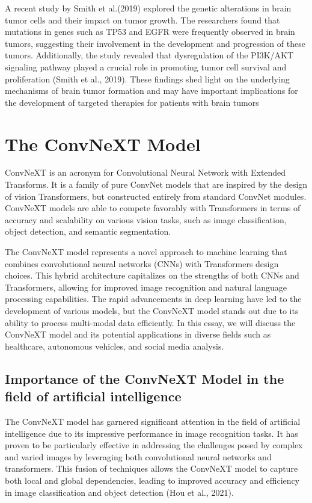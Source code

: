 \documentclass[12pt,oneside]{report}
\begin{document}
A recent study by Smith et al.(2019) explored the genetic alterations in brain tumor cells and their 
impact on tumor growth. The researchers found that mutations in genes such as TP53 and EGFR were 
frequently observed in brain tumors, suggesting their involvement in the development and progression 
of these tumors. Additionally, the study revealed that dysregulation of the PI3K/AKT signaling pathway 
played a crucial role in promoting tumor cell survival and proliferation (Smith et al., 2019). These findings 
shed light on the underlying mechanisms of brain tumor formation and may have important implications 
for the development of targeted therapies for patients with brain tumors

\section{The ConvNeXT Model}
ConvNeXT is an acronym for Convolutional Neural Network with Extended Transforms. It is a family of pure ConvNet models that are inspired by the design of vision Transformers, but constructed entirely from standard ConvNet modules. ConvNeXT models are able to compete favorably with Transformers in terms of accuracy and scalability on various vision tasks, such as image classification, object detection, and semantic segmentation.

The ConvNeXT model represents a novel approach to machine learning that combines convolutional neural networks (CNNs) with Transformers design choices. This hybrid architecture capitalizes on the strengths of both CNNs and Transformers, allowing for improved image recognition and natural language processing capabilities. The rapid advancements in deep learning have led to the development of various models, but the ConvNeXT model stands out due to its ability to process multi-modal data efficiently. In this essay, we will discuss the ConvNeXT model and its potential applications in diverse fields such as healthcare, autonomous vehicles, and social media analysis.

\subsection{Importance of the ConvNeXT Model in the field of artificial intelligence}
The ConvNeXT model has garnered significant attention in the field of artificial intelligence due to its impressive performance in image recognition tasks. It has proven to be particularly effective in addressing the challenges posed by complex and varied images by leveraging both convolutional neural networks and transformers. This fusion of techniques allows the ConvNeXT model to capture both local and global dependencies, leading to improved accuracy and efficiency in image classification and object detection (Hou et al., 2021).
\end{document}
